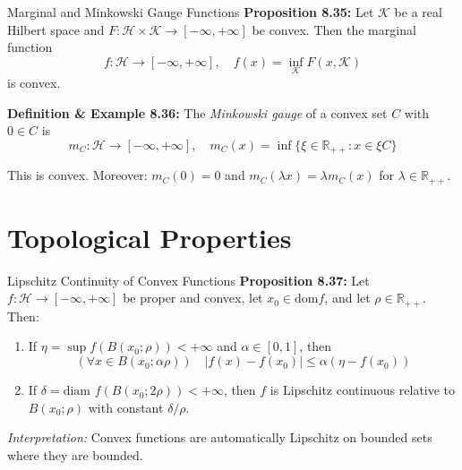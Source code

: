 \documentclass[aspectratio=169,10pt]{beamer}
\begin{document}
\begin{frame}[fragile]{Marginal and Minkowski Gauge Functions}
    \textbf{Proposition 8.35:} Let $\mathcal{K}$ be a real Hilbert space and $F : \mathcal{H} \times \mathcal{K} \to [-\infty, +\infty]$ 
    be convex. Then the marginal function
    \[
    f : \mathcal{H} \to [-\infty, +\infty], \quad f(x) = \inf_{\mathcal{K}} F(x, \mathcal{K})
    \]
    is convex.

    \vspace{0.3cm}

    \textbf{Definition \& Example 8.36:} The \textit{Minkowski gauge} of a convex set $C$ with $0 \in C$ is
    \[
    m_C : \mathcal{H} \to [-\infty, +\infty], \quad m_C(x) = \inf\{\xi \in \mathbb{R}_{++} : x \in \xi C\}
    \]
    
    This is convex. Moreover: $m_C(0) = 0$ and $m_C(\lambda x) = \lambda m_C(x)$ for $\lambda \in \mathbb{R}_{++}$.
\end{frame}


\section{Topological Properties}

\begin{frame}[fragile]{Lipschitz Continuity of Convex Functions}
    \textbf{Proposition 8.37:} Let $f : \mathcal{H} \to [-\infty, +\infty]$ be proper and convex, 
    let $x_0 \in \text{dom} f$, and let $\rho \in \mathbb{R}_{++}$. Then:
    
    \begin{enumerate}
        \item If $\eta = \sup f(B(x_0; \rho)) < +\infty$ and $\alpha \in [0,1]$, then
        \[
        (\forall x \in B(x_0; \alpha\rho)) \quad |f(x) - f(x_0)| \leq \alpha(\eta - f(x_0))
        \]
        
        \item If $\delta = \text{diam } f(B(x_0; 2\rho)) < +\infty$, then $f$ is Lipschitz continuous 
        relative to $B(x_0; \rho)$ with constant $\delta/\rho$.
    \end{enumerate}

    \vspace{0.3cm}

    \textit{Interpretation:} Convex functions are automatically Lipschitz on bounded sets where they are bounded.
\end{frame}
\end{document}
